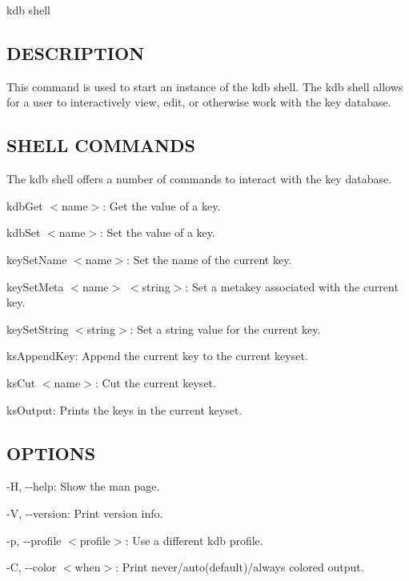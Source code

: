 {\ttfamily kdb shell}

\subsection*{D\+E\+S\+C\+R\+I\+P\+T\+I\+ON}

This command is used to start an instance of the kdb shell. The kdb shell allows for a user to interactively view, edit, or otherwise work with the key database.

\subsection*{S\+H\+E\+LL C\+O\+M\+M\+A\+N\+DS}

The kdb shell offers a number of commands to interact with the key database.


\begin{DoxyItemize}
\item {\ttfamily kdb\+Get $<$name$>$}\+: Get the value of a key.
\item {\ttfamily kdb\+Set $<$name$>$}\+: Set the value of a key.
\item {\ttfamily key\+Set\+Name $<$name$>$}\+: Set the name of the current key.
\item {\ttfamily key\+Set\+Meta $<$name$>$ $<$string$>$}\+: Set a metakey associated with the current key.
\item {\ttfamily key\+Set\+String $<$string$>$}\+: Set a string value for the current key.
\item {\ttfamily ks\+Append\+Key}\+: Append the current key to the current keyset.
\item {\ttfamily ks\+Cut $<$name$>$}\+: Cut the current keyset.
\item {\ttfamily ks\+Output}\+: Prints the keys in the current keyset.
\end{DoxyItemize}

\subsection*{O\+P\+T\+I\+O\+NS}


\begin{DoxyItemize}
\item {\ttfamily -\/H}, {\ttfamily -\/-\/help}\+: Show the man page.
\item {\ttfamily -\/V}, {\ttfamily -\/-\/version}\+: Print version info.
\item {\ttfamily -\/p}, {\ttfamily -\/-\/profile $<$profile$>$}\+: Use a different kdb profile.
\item {\ttfamily -\/C}, {\ttfamily -\/-\/color $<$when$>$}\+: Print never/auto(default)/always colored output.
\end{DoxyItemize}

